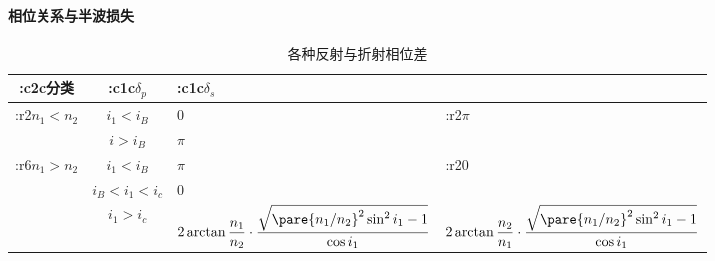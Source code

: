 \documentclass{ctexart}
\begin{document}

\paragraph{相位关系与半波损失} %
\label{par:相位关系与半波损失}

\begin{table}[ht]
    \centering
    \begin{tabular}{cc>{\centering\arraybackslash}m{3.5cm}>{\centering\arraybackslash}m{3.5cm}}
        \toprule
        \+:c{2}{c}{分类} & \+:c{1}{c}{$\delta_p$} & \+:c{1}{c}{$\delta_s$} \\
        \midrule
        \+:r{2}{$n_1 < n_2$} & $i_1 < i_B$ & $0$ & \+:r{2}{$\pi$} \\
        \cmidrule{2-3}
        & $i > i_B$ & $\pi$ & \\
        \midrule
        \+:r{6}{$n_1 > n_2$} & $i_1 < i_B$ & $\pi$ & \+:r{2}{0} \\
        \cmidrule{2-3}
         & $i_B < i_1 < i_c$ & $0$ & \\
        \cmidrule{2-4}
        & {$i_1 > i_c$} & $ \displaystyle 2\arctan \frac{n_1}{n_2}\cdot \frac{\sqrt{\pare{n_1/n_2}^2\sin^2 i_1 - 1}}{\cos i_1}$ & $\displaystyle 2\arctan \frac{n_2}{n_1}\cdot\frac{\sqrt{\pare{n_1/n_2}^2\sin^2 i_1 - 1}}{\cos i_1}$ \\
        \bottomrule
    \end{tabular}
    \caption{各种反射与折射相位差}
    \label{table:各种反射与折射相位差}
\end{table}
\end{document}
